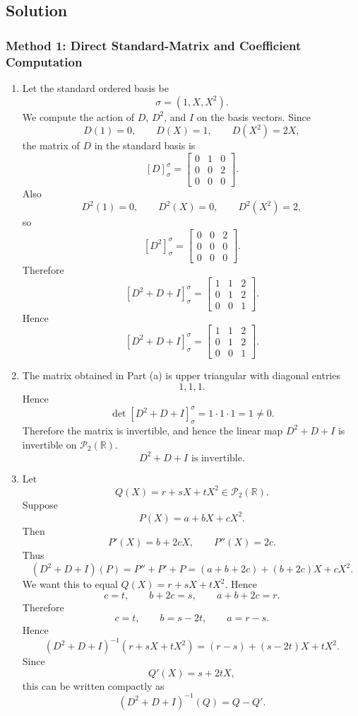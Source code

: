 \documentclass[12pt]{article}
\newcommand{\R}{\mathbb{R}}
\newcommand{\cP}{\mathcal{P}}
\begin{document}
\newpage
\subsection{Solution}

\subsubsection{Method 1: Direct Standard-Matrix and Coefficient Computation}
\begin{enumerate}[label=(\alph*)]
  \item Let the standard ordered basis be
  \[
    \sigma=(1,X,X^2).
  \]
  We compute the action of $D$, $D^2$, and $I$ on the basis vectors.
  Since
  \[
    D(1)=0,\qquad D(X)=1,\qquad D(X^2)=2X,
  \]
  the matrix of $D$ in the standard basis is
  \[
    [D]_{\sigma}^{\sigma}
    =
    \begin{bmatrix}
      0&1&0\\
      0&0&2\\
      0&0&0
    \end{bmatrix}.
  \]
  Also
  \[
    D^2(1)=0,
    \qquad
    D^2(X)=0,
    \qquad
    D^2(X^2)=2,
  \]
  so
  \[
    [D^2]_{\sigma}^{\sigma}
    =
    \begin{bmatrix}
      0&0&2\\
      0&0&0\\
      0&0&0
    \end{bmatrix}.
  \]
  Therefore
  \[
    [D^2+D+I]_{\sigma}^{\sigma}
    =
    \begin{bmatrix}
      1&1&2\\
      0&1&2\\
      0&0&1
    \end{bmatrix}.
  \]
  Hence
  \[
    \boxed{[D^2+D+I]_{\sigma}^{\sigma}
    =
    \begin{bmatrix}
      1&1&2\\
      0&1&2\\
      0&0&1
    \end{bmatrix}.}
  \]

  \item The matrix obtained in Part (a) is upper triangular with diagonal entries
  \[
    1,1,1.
  \]
  Hence
  \[
    \det [D^2+D+I]_{\sigma}^{\sigma}=1\cdot 1\cdot 1=1\ne 0.
  \]
  Therefore the matrix is invertible, and hence the linear map $D^2+D+I$ is invertible on $\cP_2(\R)$.
  \[
    \boxed{D^2+D+I\text{ is invertible}.}
  \]

  \item Let
  \[
    Q(X)=r+sX+tX^2\in\cP_2(\R).
  \]
  Suppose
  \[
    P(X)=a+bX+cX^2.
  \]
  Then
  \[
    P'(X)=b+2cX,
    \qquad
    P''(X)=2c.
  \]
  Thus
  \[
    (D^2+D+I)(P)
    =P''+P'+P
    =(a+b+2c)+(b+2c)X+cX^2.
  \]
  We want this to equal $Q(X)=r+sX+tX^2$. Hence
  \[
    c=t,
    \qquad
    b+2c=s,
    \qquad
    a+b+2c=r.
  \]
  Therefore
  \[
    c=t,
    \qquad
    b=s-2t,
    \qquad
    a=r-s.
  \]
  Hence
  \[
    (D^2+D+I)^{-1}(r+sX+tX^2)
    =(r-s)+(s-2t)X+tX^2.
  \]
  Since
  \[
    Q'(X)=s+2tX,
  \]
  this can be written compactly as
  \[
    \boxed{(D^2+D+I)^{-1}(Q)=Q-Q'.}
  \]


\end{enumerate}
\end{document}
